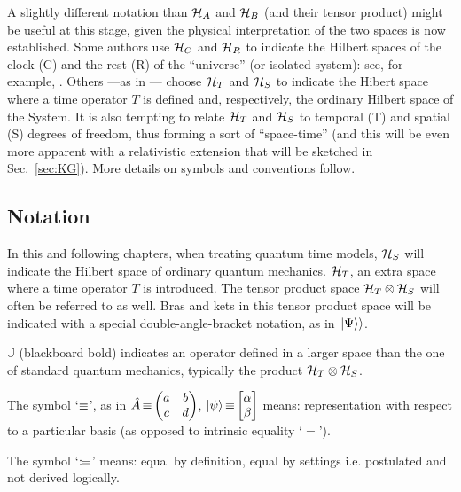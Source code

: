 A slightly different notation than $\mathcal{H}_A$ and $\mathcal{H}_B$ (and their tensor product)
might be useful at this stage, given
the physical interpretation of the two spaces is now established.
Some authors
use $\mathcal{H}_C$ and $\mathcal{H}_R$
to indicate the Hilbert spaces of the clock (C) and the rest (R) of the ``universe''
(or isolated system):
see, for example, \cite{Marletto:Evolution}.
Others ---as in \cite{Lloyd:Time}--- 
choose $\mathcal{H}_T$ and $\mathcal{H}_S$ to indicate the Hibert space where
a time operator $T$ is defined and, respectively,
the ordinary Hilbert space of the System.
It is also tempting to relate $\mathcal{H}_T$ and $\mathcal{H}_S$
to temporal (T) and spatial (S)
degrees of freedom, thus forming a sort of
``space-time'' (and this will be even more apparent
with a relativistic extension that will be sketched in Sec.~\ref{sec:KG}).
More details on symbols and conventions follow.

\subsection*{Notation}

In this and following chapters, when treating quantum time models,
$\mathcal{H}_S$ will indicate the Hilbert space of ordinary quantum mechanics.
$\mathcal{H}_T$, an extra space where a time operator ${T}$ is introduced. The tensor
product space $\mathcal{H}_T \otimes \mathcal{H}_S$
will often be referred to as well.
Bras and kets in this tensor product space will be indicated with a special double-angle-bracket
notation, as in $\left.\left| \Psi \right\rangle\right\rangle$.

${\mathbb{J}}$ (blackboard bold) indicates an  operator defined in
a larger space than the one of standard quantum mechanics,
typically the product $\mathcal{H}_T \otimes \mathcal{H}_S$.

The symbol `$\operatorname*{\equiv}$', as in $\hat{A} \repr \mqty(a&b\\c&d)$, $\ket{\psi} \repr \mqty[\alpha \\ \beta]$
means: representation with respect to a particular basis (as opposed to intrinsic equality `$=$').

The symbol `$\coloneqq$'
means: equal by definition, equal by settings i.e. postulated and not derived logically.
